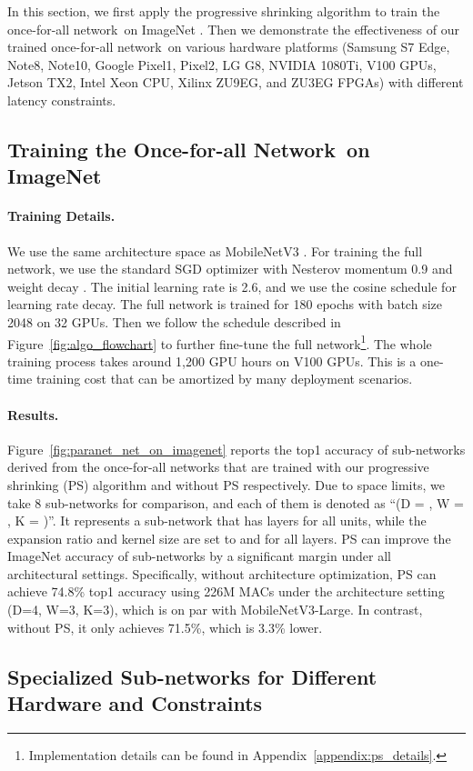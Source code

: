 \documentclass{article} \usepackage{iclr2020_conference,times}
\newcommand{\myparagraph}[1]{\vspace{-3pt}\paragraph{#1}}
\newcommand{\motherNet}{once-for-all network}
\newcommand{\motherNetCap}{Once-for-all Network}
\newcommand{\childNetCap}{Sub-network}
\begin{document}
In this section, we first apply the progressive shrinking algorithm to train the \motherNet~on ImageNet \citep{deng2009imagenet}. Then we demonstrate the effectiveness of our trained \motherNet~on various hardware platforms (Samsung S7 Edge, Note8, Note10, Google Pixel1, Pixel2, LG G8, NVIDIA 1080Ti, V100 GPUs, Jetson TX2, Intel Xeon CPU, Xilinx ZU9EG, and ZU3EG FPGAs) with different latency constraints. 

\subsection{Training the \motherNetCap~on ImageNet}

\myparagraph{Training Details.} We use the same architecture space as MobileNetV3 \citep{howard2019searching}. For training the full network, we use the standard SGD optimizer with Nesterov momentum 0.9 and weight decay . The initial learning rate is 2.6, and we use the cosine schedule \citep{loshchilov2016sgdr} for learning rate decay. The full network is trained for 180 epochs with batch size 2048 on 32 GPUs. Then we follow the schedule described in Figure~\ref{fig:algo_flowchart} to further fine-tune the full network\footnote{Implementation details can be found in Appendix~\ref{appendix:ps_details}.}. The whole training process takes around 1,200 GPU hours on V100 GPUs. This is a one-time training cost that can be amortized by many deployment scenarios. 

\myparagraph{Results.} Figure~\ref{fig:paranet_net_on_imagenet} reports the top1 accuracy of sub-networks derived from the \motherNet s that are trained with our progressive shrinking (PS) algorithm and without PS respectively. Due to space limits, we take 8 sub-networks for comparison, and each of them is denoted as ``(D = , W = , K = )''. It represents a sub-network that has  layers for all units, while the expansion ratio and kernel size are set to  and  for all layers. PS can improve the ImageNet accuracy of sub-networks by a significant margin under all architectural settings. Specifically, without architecture optimization, PS can achieve 74.8\% top1 accuracy using 226M MACs under the architecture setting (D=4, W=3, K=3), which is on par with MobileNetV3-Large. In contrast, without PS, it only achieves 71.5\%, which is 3.3\% lower.

\subsection{Specialized \childNetCap s for Different Hardware and Constraints}
\end{document}
